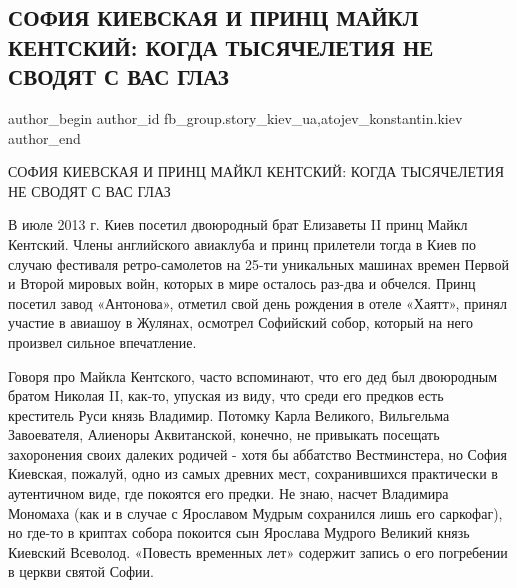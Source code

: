  
 
 
 
 
 
\subsection{СОФИЯ КИЕВСКАЯ И ПРИНЦ МАЙКЛ КЕНТСКИЙ: КОГДА ТЫСЯЧЕЛЕТИЯ НЕ СВОДЯТ С ВАС ГЛАЗ}
\label{sec:14_01_2022.fb.fb_group.story_kiev_ua.2.sofia_princ_kentskij}
 
\ifcmt
 author_begin
   author_id fb_group.story_kiev_ua,atojev_konstantin.kiev
 author_end
\fi

СОФИЯ КИЕВСКАЯ И ПРИНЦ МАЙКЛ КЕНТСКИЙ: КОГДА ТЫСЯЧЕЛЕТИЯ НЕ СВОДЯТ С ВАС ГЛАЗ

В июле 2013 г. Киев посетил двоюродный брат Елизаветы II принц Майкл Кентский.
Члены английского авиаклуба и принц прилетели тогда в Киев по случаю фестиваля
ретро-самолетов на 25-ти уникальных машинах времен Первой и Второй мировых
войн, которых в мире осталось раз-два и обчелся. Принц посетил завод
«Антонова», отметил свой день рождения в отеле «Хаятт», принял участие в
авиашоу в Жулянах, осмотрел Софийский собор, который на него произвел сильное
впечатление. 


Говоря про Майкла Кентского, часто вспоминают, что его дед был
двоюродным братом Николая II, как-то, упуская из виду, что среди его предков
есть креститель Руси князь Владимир. Потомку Карла Великого, Вильгельма
Завоевателя, Алиеноры Аквитанской, конечно, не привыкать посещать захоронения
своих далеких родичей - хотя бы аббатство Вестминстера, но София Киевская,
пожалуй, одно из самых древних мест, сохранившихся практически в аутентичном
виде, где покоятся его предки. Не знаю, насчет Владимира Мономаха (как и в
случае с Ярославом Мудрым сохранился лишь его саркофаг), но где-то в криптах
собора покоится сын Ярослава Мудрого Великий князь Киевский Всеволод. «Повесть
временных лет» содержит запись о его погребении в церкви святой Софии.  

